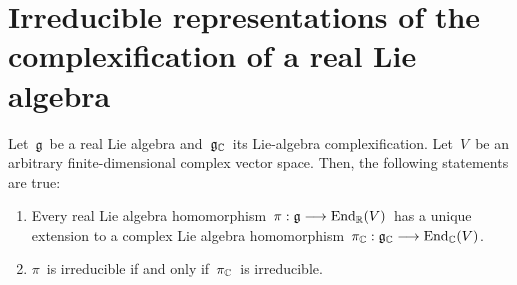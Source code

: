 
\section{Irreducible representations of the complexification of a real Lie algebra}

\begin{proposition}
\mbox{}
\vskip 0.05cm
\noindent
Let \,$\mathfrak{g}$\, be a real Lie algebra and
\,$\mathfrak{g}_{\mathbb{C}}$\, its Lie-algebra complexification.
Let \,$V$\, be an arbitrary finite-dimensional complex vector space.
Then, the following statements are true:
\begin{enumerate}
\item
	Every real Lie algebra homomorphism
	\,$\pi : \mathfrak{g} \longrightarrow \textnormal{End}_{\mathbb{R}}(V)$\,
	has a unique extension to a complex Lie algebra homomorphism
	\,$\pi_{\mathbb{C}} : \mathfrak{g}_{\mathbb{C}} \longrightarrow \textnormal{End}_{\mathbb{C}}(V)$.\,
\item
	$\pi$\, is irreducible if and only if \,$\pi_{\mathbb{C}}$\, is irreducible.
\end{enumerate}
\end{proposition}
\proof
